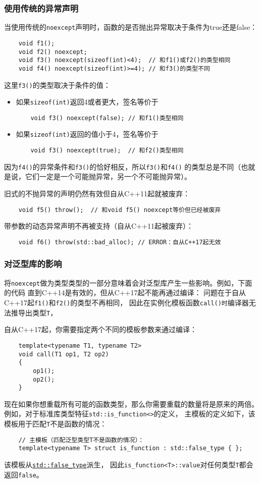 \subsubsection{使用传统的异常声明}
当使用传统的\texttt{noexcept}声明时，函数的是否抛出异常取决于条件为true还是false：
\begin{lstlisting}
    void f1();
    void f2() noexcept;
    void f3() noexcept(sizeof(int)<4);  // 和f1()或f2()的类型相同
    void f4() noexcept(sizeof(int)>=4); // 和f3()的类型不同
\end{lstlisting}
这里\texttt{f3()}的类型取决于条件的值：
\begin{itemize}
    \item 如果\texttt{sizeof(int)}返回4或者更大，签名等价于
    \begin{lstlisting}
    void f3() noexcept(false); // 和f1()类型相同
    \end{lstlisting}
    \item 如果\texttt{sizeof(int)}返回的值小于4，签名等价于
    \begin{lstlisting}
    void f3() noexcept(true);  // 和f2()类型相同
    \end{lstlisting}
\end{itemize}
因为\texttt{f4()}的异常条件和\texttt{f3()}的恰好相反，所以\texttt{f3()}和\texttt{f4()}
的类型总是不同（也就是说，它们一定是一个可能抛异常，另一个不可能抛异常）。

旧式的不抛异常的声明仍然有效但自从C++11起就被废弃：
\begin{lstlisting}
    void f5() throw();  // 和void f5() noexcept等价但已经被废弃
\end{lstlisting}
带参数的动态异常声明不再被支持（自从C++11起被废弃）：
\begin{lstlisting}
    void f6() throw(std::bad_alloc); // ERROR：自从C++17起无效
\end{lstlisting}

\subsubsection{对泛型库的影响}
将\texttt{noexcept}做为类型类型的一部分意味着会对泛型库产生一些影响。例如，下面的代码
直到C++14是有效的，但从C++17起不能再通过编译：
问题在于自从C++17起\texttt{f1()}和\texttt{f2()}的类型不再相同，
因此在实例化模板函数\texttt{call()时}编译器无法推导出类型\texttt{T}，

自从C++17起，你需要指定两个不同的模板参数来通过编译：
\begin{lstlisting}
    template<typename T1, typename T2>
    void call(T1 op1, T2 op2)
    {
        op1();
        op2();
    }
\end{lstlisting}
现在如果你想重载所有可能的函数类型，那么你需要重载的数量将是原来的两倍。
例如，对于标准库类型特征\texttt{std::is\_function<>}的定义，
主模板的定义如下，该模板用于匹配\texttt{T}不是函数的情况：
\begin{lstlisting}
    // 主模板（匹配泛型类型T不是函数的情况）：
    template<typename T> struct is_function : std::false_type { };
\end{lstlisting}
该模板从\hyperref[ch33.2]{\texttt{std::false\_type}}派生，
因此\texttt{is\_function<T>::value}对任何类型\texttt{T}都会返回\texttt{false}。

